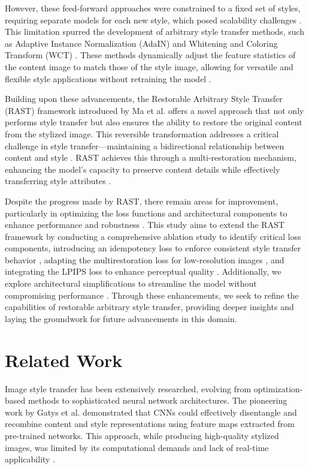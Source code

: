 \documentclass{article}
\begin{document}
However, these feed-forward approaches were constrained to a fixed set of styles, requiring separate models for each new style, which posed scalability challenges \cite{Johnson2016}. This limitation spurred the development of arbitrary style transfer methods, such as Adaptive Instance Normalization (AdaIN) \cite{Huang2017} and Whitening and Coloring Transform (WCT) \cite{Li2017}. These methods dynamically adjust the feature statistics of the content image to match those of the style image, allowing for versatile and flexible style applications without retraining the model \cite{Huang2017, Li2017}.

Building upon these advancements, the Restorable Arbitrary Style Transfer (RAST) framework introduced by Ma et al. \cite{Ma2023RAST} offers a novel approach that not only performs style transfer but also ensures the ability to restore the original content from the stylized image. This reversible transformation addresses a critical challenge in style transfer—maintaining a bidirectional relationship between content and style \cite{CycleGAN2017, Ma2023RAST}. RAST achieves this through a multi-restoration mechanism, enhancing the model's capacity to preserve content details while effectively transferring style attributes \cite{Ma2023RAST}.

Despite the progress made by RAST, there remain areas for improvement, particularly in optimizing the loss functions and architectural components to enhance performance and robustness \cite{Liu2020, Wang2020}. This study aims to extend the RAST framework by conducting a comprehensive ablation study to identify critical loss components, introducing an idempotency loss to enforce consistent style transfer behavior \cite{SomeOtherPaper}, adapting the multirestoration loss for low-resolution images \cite{Li2018}, and integrating the LPIPS loss to enhance perceptual quality \cite{Zhang2018LPIPS}. Additionally, we explore architectural simplifications to streamline the model without compromising performance \cite{Vazquez2018}. Through these enhancements, we seek to refine the capabilities of restorable arbitrary style transfer, providing deeper insights and laying the groundwork for future advancements in this domain.

\section{Related Work}
\label{sec:related_work}

Image style transfer has been extensively researched, evolving from optimization-based methods to sophisticated neural network architectures. The pioneering work by Gatys et al. \cite{Gatys2016} demonstrated that CNNs could effectively disentangle and recombine content and style representations using feature maps extracted from pre-trained networks. This approach, while producing high-quality stylized images, was limited by its computational demands and lack of real-time applicability \cite{Gatys2016}.
\end{document}
